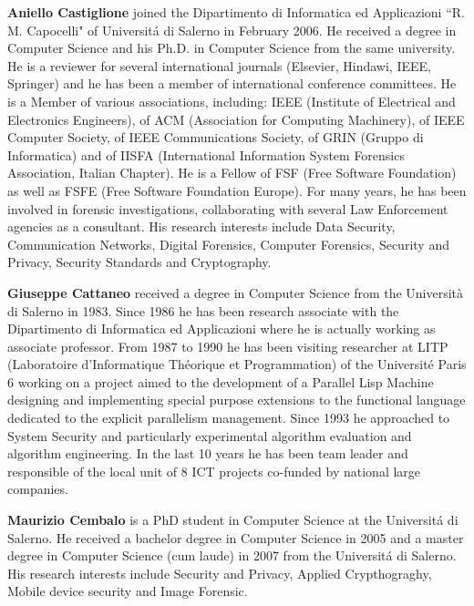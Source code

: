 \documentclass[authoryear]{elsarticle}
\begin{document}
\textbf{Aniello Castiglione} joined the Dipartimento di Informatica ed Applicazioni ``R. M. Capocelli" of Universit\'{a} di Salerno in February 2006. He received a degree in Computer Science and his Ph.D. in Computer Science from the same university.
He is a reviewer for several international journals (Elsevier, Hindawi, IEEE, Springer) and he has been a member of international conference committees. He is a Member of various associations, including: IEEE (Institute of Electrical and Electronics Engineers), of ACM (Association for Computing Machinery), of IEEE Computer Society, of IEEE Communications Society, of GRIN (Gruppo di Informatica) and of  IISFA (International Information System Forensics Association, Italian Chapter). He is a Fellow of FSF (Free Software Foundation) as well as FSFE (Free Software Foundation Europe). For many years, he has been involved in forensic investigations, collaborating with several Law Enforcement agencies as a consultant. His research interests include Data Security, Communication Networks, Digital Forensics, Computer Forensics, Security and Privacy, Security Standards and Cryptography.

\medskip

\textbf{Giuseppe Cattaneo} received a degree in Computer Science from the Universit\`a di Salerno in 1983.
Since 1986 he has been research associate with the Dipartimento di Informatica ed Applicazioni
where he is actually working as associate professor. From 1987 to 1990 he has been visiting researcher at LITP (Laboratoire d'Informatique Th\'eorique et Programmation) of the  Universit\'e Paris 6 working on a project aimed to the development of a Parallel Lisp Machine designing and implementing special purpose extensions to the functional language dedicated to the explicit parallelism management. Since 1993 he approached to System Security and particularly experimental algorithm evaluation and algorithm engineering. In the last 10 years he has been team leader and responsible of the local unit of 8 ICT projects co-funded by national large companies.

\medskip

\textbf{Maurizio Cembalo} is a PhD student in Computer Science at the Universit\'{a} di Salerno. He received a bachelor degree in Computer Science in 2005 and a master degree in Computer Science (cum laude) in 2007 from the Universit\'{a} di Salerno. His research interests include Security and Privacy, Applied Crypthograghy, Mobile device security and Image Forensic.

\medskip
\end{document}
